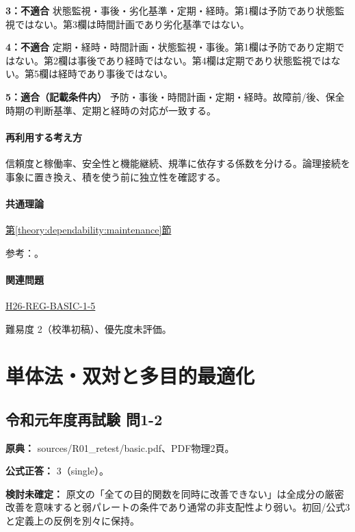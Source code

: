 \noindent\textbf{3：不適合} 状態監視・事後・劣化基準・定期・経時。第1欄は予防であり状態監視ではない。第3欄は時間計画であり劣化基準ではない。\par

\noindent\textbf{4：不適合} 定期・経時・時間計画・状態監視・事後。第1欄は予防であり定期ではない。第2欄は事後であり経時ではない。第4欄は定期であり状態監視ではない。第5欄は経時であり事後ではない。\par

\noindent\textbf{5：適合（記載条件内）} 予防・事後・時間計画・定期・経時。故障前/後、保全時期の判断基準、定期と経時の対応が一致する。\par

\paragraph{再利用する考え方} 信頼度と稼働率、安全性と機能継続、規準に依存する係数を分ける。論理接続を事象に置き換え、積を使う前に独立性を確認する。

\paragraph{共通理論} \hyperref[theory:dependability:maintenance]{第\ref*{theory:dependability:maintenance}節}

\par 参考：\cite{maintenance_mlit_2013}。

\paragraph{関連問題} \hyperref[q:h26-reg-basic-1-5]{H26-REG-BASIC-1-5}

\par 難易度 2（校準初稿）、優先度未評価。

\section{単体法・双対と多目的最適化}

\subsection{令和元年度再試験 問1-2}
\label{q:r01-ret-basic-1-2}

\noindent\textbf{原典：} sources/R01\_retest/basic.pdf、PDF物理2頁。

\textbf{公式正答：} 3（single）。

\par\textbf{検討未確定：} 原文の「全ての目的関数を同時に改善できない」は全成分の厳密改善を意味すると弱パレートの条件であり通常の非支配性より弱い。初回/公式3と定義上の反例を別々に保持。


